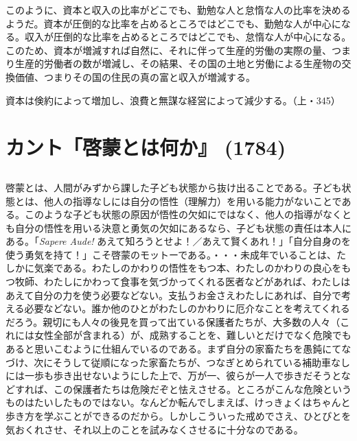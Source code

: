 このように、資本と収入の比率がどこでも、勤勉な人と怠惰な人の比率を決めるようだ。資本が圧倒的な比率を占めるところではどこでも、勤勉な人が中心になる。収入が圧倒的な比率を占めるところではどこでも、怠惰な人が中心になる。このため、資本が増減すれば自然に、それに伴って生産的労働の実際の量、つまり生産的労働者の数が増減し、その結果、その国の土地と労働による生産物の交換価値、つまりその国の住民の真の富と収入が増減する。

資本は倹約によって増加し、浪費と無謀な経営によって減少する。（上・345）


\newpage{}
\section{カント「啓蒙とは何か』 (1784)}


\subsection{}



啓蒙とは、人間がみずから課した子ども状態から抜け出ることである。子ども状態とは、他人の指導なしには自分の悟性（理解力）を用いる能力がないことである。このような子ども状態の原因が悟性の欠如にではなく、他人の指導がなくとも自分の悟性を用いる決意と勇気の欠如にあるなら、子ども状態の責任は本人にある。「\emph{Sapere Aude!} あえて知ろうとせよ！／あえて賢くあれ！」「自分自身のを使う勇気を持て！」こそ啓蒙のモットーである。・・・未成年でいることは、たしかに気楽である。わたしのかわりの悟性をもつ本、わたしのかわりの良心をもつ牧師、わたしにかわって食事を気づかってくれる医者などがあれば、わたしはあえて自分の力を使う必要などない。支払うお金さえわたしにあれば、自分で考える必要などない。誰か他のひとがわたしのかわりに厄介なことを考えてくれるだろう。親切にも人々の後見を買って出ている保護者たちが、大多数の人々（これには女性全部が含まれる）が、成熟することを、難しいとだけでなく危険でもあると思いこむように仕組んでいるのである。まず自分の家畜たちを愚鈍にてなづけ、次にそうして従順になった家畜たちが、つなぎとめられている補助車なしには一歩も歩き出せないようにした上で、万が一、彼らが一人で歩きだそうとなどすれば、この保護者たちは危険だぞと怯えさせる。ところがこんな危険というものはたいしたものではない。なんどか転んでしまえば、けっきょくはちゃんと歩き方を学ぶことができるのだから。しかしこういった戒めでさえ、ひとびとを気おくれさせ、それ以上のことを試みなくさせるに十分なのである。



